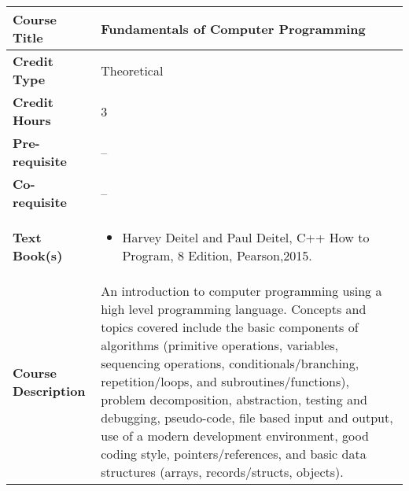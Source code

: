 \documentclass[11pt]{article}
\begin{document}
\begin{table}[h!]
\begin{tabular}{|l|l|}
\hline
\textbf{Course Title}       &   Fundamentals of Computer Programming\\ \hline
\textbf{Credit Type}        &  Theoretical \\ \hline
\textbf{Credit Hours}       &  3 \\ \hline
\textbf{Pre-requisite}       & -- \\ \hline
\textbf{Co-requisite}       &  -- \\ \hline
\textbf{Text Book(s)}       & \begin{minipage}{.70\textwidth}
\begin{itemize} \itemsep-0.4em
	\vspace{3mm}
	\item Harvey Deitel and Paul Deitel, C++ How to Program, 8 Edition, Pearson,2015.
	\vspace{3mm}
\end{itemize}
\end{minipage}\\ \hline
\textbf{Course Description} & \begin{minipage}{.70\textwidth}
\vspace{3mm}
An introduction to computer programming using a high level programming language. Concepts and topics
covered include the basic components of algorithms (primitive operations, variables, sequencing operations,
conditionals/branching, repetition/loops, and subroutines/functions), problem decomposition, abstraction, testing
and debugging, pseudo-code, file based input and output, use of a modern development environment, good
coding style, pointers/references, and basic data structures (arrays, records/structs, objects).
\vspace{3mm}
\end{minipage} \\ \hline
\end{tabular}
\end{table}
\end{document}
